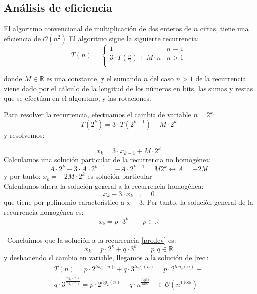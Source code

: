 \documentclass[a4paper, 11pt]{article} %
\begin{document}
\subsection{Análisis de eficiencia}
El algoritmo convencional de multiplicación de dos enteros de $n$ cifras, tiene una eficiencia de $\mathcal{O}(n^2)$
El algoritmo sigue la siguiente recurrencia:
\begin{equation}\label{rec}
 T(n)=\left\lbrace
	    \begin{array}{lr}
            1 & n=1\\
            3\cdot T\left(\frac{n}{2}\right) + M\cdot n & n>1\\
            \end{array}
	    \right.
\end{equation}

donde $M\in\mathbb{R}$ es una constante, y el sumando $n$ del caso $n>1$ de la recurrencia viene dado por el cálculo
de la longitud de los números en bits, las sumas y restas que se efectúan en el algoritmo, y las rotaciones.

Para resolver la recurrencia, efectuamos el cambio de variable $n=2^k$:
\begin{equation}\label{prodcv}
 T(2^k)=3\cdot T(2^{k-1}) + M\cdot 2^k
\end{equation}
y resolvemos: 

\begin{equation}
x_k=3\cdot x_{k-1}+M\cdot 2^k
\end{equation}
Calculamos una solución particular de la recurrencia no homogénea:
$$A\cdot 2^k - 3\cdot A \cdot 2^{k-1}=-A\cdot 2^{k-1}=M2^k \leftrightarrow A=-2M$$
y por tanto: $x_k=-2M \cdot 2^k$ es solución particular\\
Calculamos ahora la solución general a la recurrencia homogénea:
$$ x_k-3\cdot x_{k-1}=0$$
que tiene por polinomio característico a $x-3$. Por tanto, la solución general de la
recurrencia homogénea es:
$$ x_k= p\cdot 3^k\qquad p\in\mathbb{R}$$
\\\
Concluimos que la solución a la recurrencia \ref{prodcv} es: 
\begin{equation}
x_k = p \cdot 2^k + q \cdot 3^k \qquad p,q \in \mathbb{R}
\end{equation}
y deshaciendo el cambio en variable, llegamos a la solución de \ref{rec}:
\begin{eqnarray*}
T(n)=p \cdot 2^{log_2(n)} + q \cdot 3^{log_2(n)} = p \cdot 2^{log_2(n)} +\\
q \cdot 3^{\frac{log_3(n)}{log_2(n)}}=p \cdot 2^{log_2(n)} + q \cdot n^{\frac{log3)}{log2}} \quad \in \mathcal{O}(n^{1.585})
\end{eqnarray*}
\end{document}
